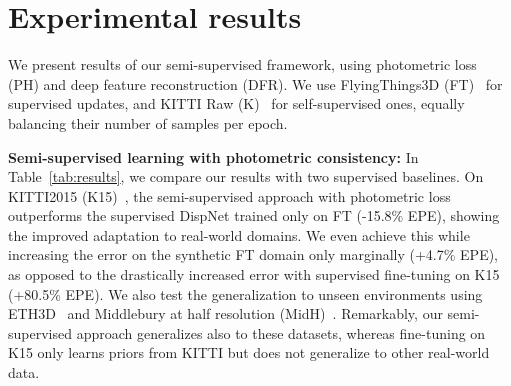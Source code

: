 \documentclass[final]{cvpr}
\begin{document}
\section{Experimental results}
We present results of our semi-supervised framework, using photometric loss (PH) and deep feature reconstruction (DFR).
We use FlyingThings3D (FT)~\cite{mayer2016large} for supervised updates, and KITTI Raw (K)~\cite{Geiger2013IJRR} for self-supervised ones, equally balancing their number of samples per epoch. 

\textbf{Semi-supervised learning with photometric consistency:}
In Table~\ref{tab:results}, we compare our results with two supervised baselines. On KITTI2015 (K15)~\cite{Menze2018JPRS}, the semi-supervised approach with photometric loss outperforms the supervised DispNet trained only on FT (-15.8\% EPE), showing the improved adaptation to real-world domains. We even achieve this while increasing the error on the synthetic FT domain only marginally (+4.7\% EPE), as opposed to the drastically increased error with supervised fine-tuning on K15 (+80.5\% EPE).
We also test the generalization to unseen environments using ETH3D~\cite{schoeps2017cvpr} and Middlebury at half resolution (MidH)~\cite{mid14}.
Remarkably, our semi-supervised approach generalizes also to these datasets, whereas fine-tuning on K15 only learns priors from KITTI but does not generalize to other real-world data. 
\end{document}
